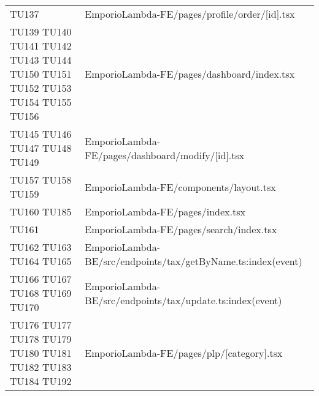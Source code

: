 {\begin{longtable}{C{2cm} C{12.8cm}}
TU137 & EmporioLambda-FE/pages/profile/order/[id].tsx\\

TU139 \newline TU140 \newline TU141 \newline TU142 \newline TU143 \newline TU144 \newline TU150 \newline TU151 \newline TU152 \newline TU153 \newline TU154 \newline TU155 \newline TU156 & EmporioLambda-FE/pages/dashboard/index.tsx\\

TU145 \newline TU146 \newline TU147 \newline TU148 \newline TU149 & EmporioLambda-FE/pages/dashboard/modify/[id].tsx\\



TU157 \newline TU158 \newline TU159 & EmporioLambda-FE/components/layout.tsx\\

TU160 \newline TU185 & EmporioLambda-FE/pages/index.tsx\\

TU161 & EmporioLambda-FE/pages/search/index.tsx\\

TU162 \newline TU163 \newline TU164 \newline TU165 & EmporioLambda-BE/src/endpoints/tax/getByName.ts:index(event)\\

TU166 \newline TU167 \newline TU168 \newline TU169 \newline TU170 & EmporioLambda-BE/src/endpoints/tax/update.ts:index(event)\\

TU176 \newline TU177 \newline TU178 \newline TU179 \newline TU180 \newline TU181 \newline TU182 \newline TU183 \newline TU184 \newline TU192 & EmporioLambda-FE/pages/plp/[category].tsx\\



\end{longtable}}
